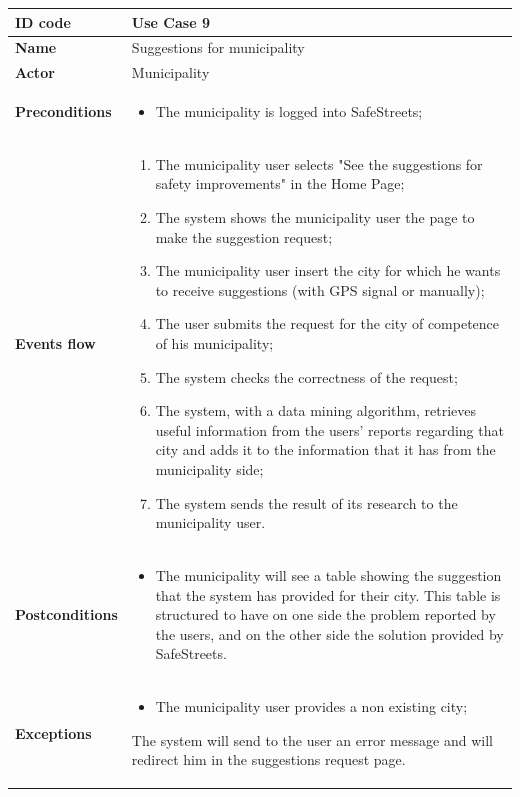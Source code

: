 \documentclass[titlepage]{article}
\begin{document}
\newpage

\begin{longtable}{| p{3 cm} | p{10 cm} |} 
\hline

\textbf{ID code} & Use Case 9 \\ \hline
\textbf{Name} & Suggestions for municipality \\ \hline
\textbf{Actor} & Municipality \\ \hline
\textbf{Preconditions} &
\begin{itemize}
\item The municipality is logged into SafeStreets;
\end{itemize} \\ \hline

\textbf{Events flow} & 
\begin{enumerate}
\item The municipality user selects "See the suggestions for safety improvements" in the Home Page;
\item The system shows the municipality user the page to make the suggestion request;
\item The municipality user insert the city for which he wants to receive suggestions (with GPS signal or manually);
\item The user submits the request for the city of competence of his municipality;
\item The system checks the correctness of the request;
\item The system, with a data mining algorithm, retrieves useful information from the users' reports regarding that city and adds it to the information that it has from the municipality side;
\item The system sends the result of its research to the municipality user.
\end{enumerate} \\ \hline

\textbf{Postconditions} &
\begin{itemize}
\item The municipality will see a table showing the suggestion that the system has provided for their city. This table is structured to have on one side the problem reported by the users, and on the other side the solution provided by SafeStreets.
\end{itemize} \\ \hline

\textbf{Exceptions} &
\begin{itemize}

\item The municipality user provides a non existing city;
\end{itemize}
The system will send to the user an error message and will redirect him in the suggestions request page. \\ \hline

\end{longtable}
\end{document}
